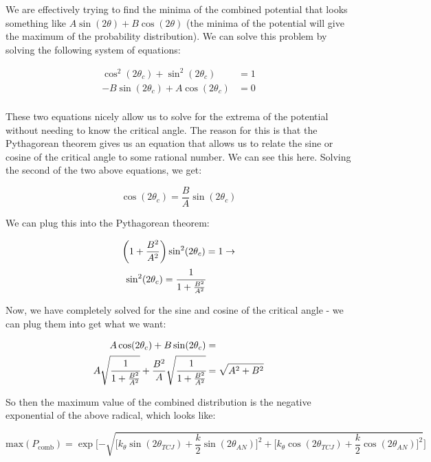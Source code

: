 \documentclass[12pt]{article}
\begin{document}
We are effectively trying to find the minima of the combined potential that looks something like $A \sin(2\theta) + B \cos(2\theta)$ (the minima of the potential will give the maximum of the probability distribution). We can solve this problem by solving the following system of equations:
\begin{center}
\begin{equation}
\begin{split}
\cos^2(2\theta_c) + \sin^2(2\theta_c) &= 1\\
-B \sin(2\theta_c) + A\cos(2\theta_c) &= 0\\
\end{split}
\end{equation}
\end{center}
These two equations nicely allow us to solve for the extrema of the potential without needing to know the critical angle. The reason for this is that the Pythagorean theorem gives us an equation that allows us to relate the sine or cosine of the critical angle to some rational number. We can see this here. Solving the second of the two above equations, we get:
\begin{center}
\begin{equation}
\cos(2\theta_c) = \frac{B}{A} \sin(2\theta_c)
\end{equation}
\end{center}
We can plug this into the Pythagorean theorem:
\begin{center}
\begin{equation}
\begin{split}
\bigg(1+\frac{B^2}{A^2}\bigg) \sin^2(2\theta_c) &= 1 \rightarrow \\
\sin^2(2\theta_c) = \cfrac{1}{1+\frac{B^2}{A^2}}
\end{split}
\end{equation}
\end{center}
Now, we have completely solved for the sine and cosine of the critical angle - we can plug them into get what we want:
\begin{center}
\begin{equation}
\begin{split}
A\cos(2\theta_c) + B\sin(2\theta_c) &= \\
A \sqrt{\cfrac{1}{1+\frac{B^2}{A^2}}} + \frac{B^2}{A} \sqrt{\cfrac{1}{1+\frac{B^2}{A^2}}} &= \sqrt{A^2 + B^2} \\
\end{split}
\end{equation}
\end{center}
So then the maximum value of the combined distribution is the negative exponential of the above radical, which looks like:
\begin{center}
\begin{equation}
\text{max}(P_{\text{comb}}) = \exp\bigg[{-\sqrt{\big[k_\theta\sin(2\theta_{TCJ}) + \frac{k}{2}\sin(2 \theta_{AN}) \big]^2 + \big[k_\theta\cos(2\theta_{TCJ}) + \frac{k}{2}\cos(2\theta_{AN})\big]^2 }}\bigg]
\end{equation}
\end{center}
\end{document}

